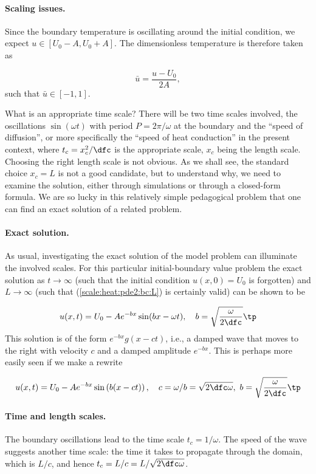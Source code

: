 \documentclass[graybox,envcountchap,sectrefs,final]{svmonodo}
\begin{document}
\paragraph{Scaling issues.}
Since the boundary temperature is oscillating around the initial
condition, we expect $u\in [U_0-A,U_0+A]$.
The dimensionless temperature is therefore taken as

\[ \bar u = \frac{u-U_0}{2A},\]
such that $\bar u\in [-1,1]$.

What is an appropriate time scale? There will be two time scales involved,
the oscillations $\sin(\omega t)$ with period $P=2\pi/\omega$ at
the boundary and the ``speed of diffusion'', or more specifically
the ``speed of heat conduction'' in the present context,
where $t_c=x_c^2/\dfc$ is the appropriate scale, $x_c$ being
the length scale. Choosing the right length scale is not obvious. As
we shall see, the standard choice $x_c=L$ is not a good candidate, but
to understand why, we need to examine the solution, either through
simulations or through a closed-form formula. We are so lucky in this
relatively simple pedagogical problem that one can find an exact solution
of a related problem.

\paragraph{Exact solution.}
As usual, investigating the exact solution of the model problem can
illuminate the involved scales. For this particular initial-boundary
value problem the exact solution as $t\rightarrow\infty$
(such that
the initial condition $u(x,0)=U_0$ is forgotten)
and $L\rightarrow\infty$ (such that (\ref{scale:heat:pde2:bc:L})
is certainly valid) can be shown to be

\begin{equation}
u(x,t) = U_0 - Ae^{-bx}\sin (bx - \omega t),\quad b =\sqrt{\frac{\omega}{2\dfc}}\tp
\label{scale:heat:daynight:sol}
\end{equation}
This solution is of the form $e^{-bx}g(x-ct)$, i.e., a damped wave that
moves to the right with velocity $c$ and a damped amplitude $e^{-bx}$.
This is perhaps more easily seen if we make a rewrite

\[ u(x,t) = U_0 - Ae^{-bx}\sin\left(b(x - ct)\right),\quad
c=\omega/b = \sqrt{2\dfc\omega},\  b =\sqrt{\frac{\omega}{2\dfc}}\tp\]

\paragraph{Time and length scales.}
The boundary oscillations lead to the time scale $t_c=1/\omega$.
The speed of the wave suggests another time scale: the time it
takes to propagate through the domain, which is $L/c$, and
hence $t_c = L/c = L/\sqrt{2\dfc\omega}$.
\end{document}
